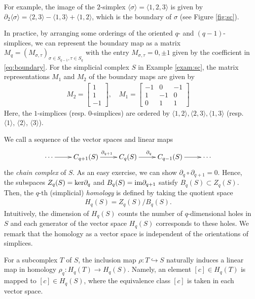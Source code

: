 \documentclass{article}
\begin{document}
For example, the image of the $2$-simplex $\langle\sigma\rangle=\langle 1,2,3\rangle$ is given by $\partial_2\langle\sigma\rangle=\langle2,3\rangle-\langle1,3\rangle+\langle1,2\rangle$, which is the boundary of $\sigma$ (see Figure \ref{fig:sc}). 

In practice, by arranging some orderings of the oriented $q$- and $(q-1)$- simplices, we can represent the boundary map as a matrix $M_q=(M_{\sigma,\tau})_{\sigma\in S_{q-1},\tau\in S_q}$ with the entry $M_{\sigma,\tau}=0,\pm 1$ given by the coefficient in \eqref{eq:boundary}.
For the simplicial complex $S$ in Example \ref{exam:sc}, the matrix representations $M_1$ and $M_2$ of the boundary maps are  given by 
\begin{align}\label{eq:matrix}
M_2=\left[
\begin{array}{r}
1\\
1\\
-1
\end{array}\right],\quad
M_1=\left[
\begin{array}{rrr}
-1& 0&-1\\
 1&-1&0\\
 0& 1&1
\end{array}
\right]
\end{align}
Here, the $1$-simplices (resp. $0$-simplices) are ordered by $\langle 1,2\rangle, \langle2,3\rangle, \langle 1,3\rangle$ (resp. $\langle1\rangle$, $\langle2\rangle$, $\langle3\rangle$).


We call a sequence of the vector spaces and linear maps
\begin{align*}
\xymatrix{
\cdots\ar[r] & C_{q+1}(S)\ar[r]^{\partial_{q+1}} & C_q(S)\ar[r]^{\partial_q} & C_{q-1}(S)\ar[r] & \cdots
}
\end{align*}
the {\em chain complex} of $S$. As an easy exercise, we can show $\partial_{q}\circ \partial_{q+1}=0$.
Hence, the subspaces $Z_q(S)={\rm ker}\partial_q$ and $B_q(S)={\rm im}\partial_{q+1}$ satisfy $B_q(S)\subset Z_q(S)$. Then, the $q$-th (simplicial) {\em homology} is defined by taking the quotient space
\begin{align*}
H_q(S)=Z_q(S)/B_q(S).
\end{align*}
Intuitively, the dimension of $H_q(S)$ counts the number of $q$-dimensional holes in $S$ and each generator of the vector space $H_q(S)$ corresponds to these holes.
We remark that the homology as a vector space is independent of the orientations of simplices. 

For a subcomplex $T$ of $S$, the inclusion map $\rho:T\hookrightarrow S$ naturally induces a linear map in homology $\rho_q: H_q(T)\rightarrow H_q(S)$. Namely, an element $[c]\in H_q(T)$ is mapped to $[c]\in H_q(S)$, where the equivalence class $[c]$ is taken in each vector space. 
\end{document}
